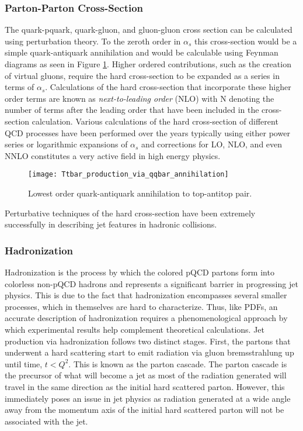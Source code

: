 \subsubsection{Parton-Parton Cross-Section}
The quark-pquark, quark-gluon, and gluon-gluon cross section can be calculated using perturbation theory.  To the zeroth order in $\alpha_{s}$ this cross-section would be a simple quark-antiquark annihilation and would be calculable using Feynman diagrams as seen in Figure \ref{fig:qqbar}\cite{Collins:1989gx}.  Higher ordered contributions, such as the creation of virtual gluons, require the hard cross-section to be expanded as a series in terms of $\alpha_{s}$.  Calculations of the hard cross-section that incorporate these higher order terms are known as \textit{next-to-leading order} (NLO) with N denoting the number of terms after the leading order that have been included in the cross-section calculation.  Various calculations of the hard cross-section of different QCD processes have been performed over the years typically using either power series or logarithmic expansions of $\alpha_{s}$\cite{Brambilla:2006wp} and corrections for LO, NLO, and even NNLO constitutes a very active field in high energy physics.

\begin{figure}[h]
\texttt{[image: Ttbar\_production\_via\_qqbar\_annihilation]}
\centering
\caption{Lowest order quark-antiquark annihilation to top-antitop pair\cite{Erdmann:2001ne}.}
\label{fig:qqbar}
\end{figure}

Perturbative techniques of the hard cross-section have been extremely successfully in describing jet features in hadronic collisions\cite{Fritzsch:1992mu}.

\subsubsection{Hadronization}

Hadronization is the process by which the colored pQCD partons form into colorless non-pQCD hadrons and represents a significant barrier in progressing jet physics.  This is due to the fact that hadronization encompasses several smaller processes, which in themselves are hard to characterize. Thus, like PDFs, an accurate description of hadronization requires a phenomenological approach by which experimental results help complement theoretical calculations.  Jet production via hadronization\cite{Webber:1994zd} follows two distinct stages.  First, the partons that underwent a hard scattering start to emit radiation via gluon bremsstrahlung up until time, $t < Q^{2}$.  This is known as the parton cascade.  The parton cascade is the precursor of what will become a jet as most of the radiation generated will travel in the same direction as the initial hard scattered parton.  However, this immediately poses an issue in jet physics as radiation generated at a wide angle away from the momentum axis of the initial hard scattered parton will not be associated with the jet.

